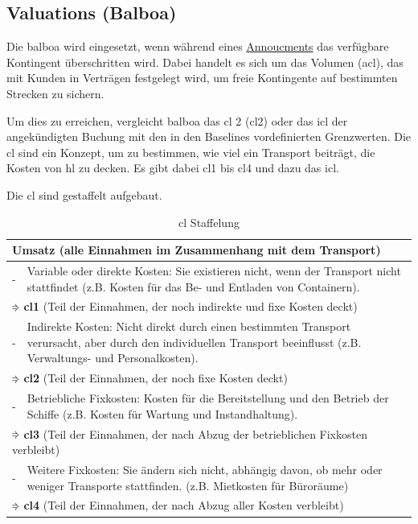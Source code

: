 \subsection{Valuations (Balboa)}
\label{ref:balboa}
Die \gls{balboa} wird eingesetzt, wenn während eines \hyperref[ref:announcement]{Annoucments} das verfügbare Kontingent überschritten wird. 
Dabei handelt es sich um das Volumen (\gls{acl}), das mit Kunden in Verträgen festgelegt wird, um freie Kontingente auf bestimmten Strecken zu sichern.  


Um dies zu erreichen, vergleicht \gls{balboa} das \acrlong{cl} 2 (\acrshort{cl}2) oder das \gls{icl} der angekündigten Buchung mit den in den Baselines vordefinierten Grenzwerten. 
Die \gls{cl} sind ein Konzept, um zu bestimmen, wie viel ein Transport beiträgt, die Kosten von \gls{hl} zu decken.
Es gibt dabei \gls{cl}1 bis \gls{cl}4 und dazu das \gls{icl}.

Die \acrlong{cl} sind gestaffelt aufgebaut. 

\begin{table}[H]
    \centering
    \begin{tabular}{p{1cm}p{14cm}}
        \hline\hline
         \multicolumn{2}{l}{\textbf{Umsatz} (alle Einnahmen im Zusammenhang mit dem Transport)} \\ \hline
         - & Variable oder direkte Kosten: Sie existieren nicht, wenn der Transport nicht stattfindet (z.B. Kosten für das Be- und Entladen von Containern). \\
         \multicolumn{2}{l}{ $\implyarrow$ \textbf{\gls{cl}1} (Teil der Einnahmen, der noch indirekte und fixe Kosten deckt)} \\ \hline
         - & Indirekte Kosten: Nicht direkt durch einen bestimmten Transport verursacht, aber durch den individuellen Transport beeinflusst (z.B. Verwaltungs- und Personalkosten). \\
         \multicolumn{2}{l}{ $\implyarrow$ \textbf{\gls{cl}2} (Teil der Einnahmen, der noch fixe Kosten deckt)} \\ \hline
         - & Betriebliche Fixkosten: Kosten für die Bereitstellung und den Betrieb der Schiffe (z.B. Kosten für Wartung und Instandhaltung). \\
         \multicolumn{2}{l}{ $\implyarrow$ \textbf{\gls{cl}3} (Teil der Einnahmen, der nach Abzug der betrieblichen Fixkosten verbleibt)} \\ \hline
         - & Weitere Fixkosten: Sie ändern sich nicht, abhängig davon, ob mehr oder weniger Transporte stattfinden. (z.B. Mietkosten für Büroräume) \\
         \multicolumn{2}{l}{ $\implyarrow$ \textbf{\gls{cl}4} (Teil der Einnahmen, der nach Abzug aller Kosten verbleibt)} \\ \hline\hline
    \end{tabular}
    \caption{\acrlong{cl} Staffelung}
    \label{tab:cl_table}
\end{table}

